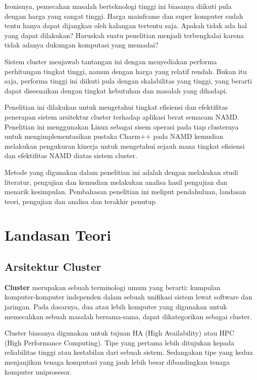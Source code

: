 \documentclass[aps,showpacs,pre,floatfix]{revtex4}
\begin{document}
Ironisnya, pemecahan masalah berteknologi tinggi ini biasanya
diikuti pula dengan harga yang sangat tinggi. Harga mainframe dan
super komputer sudah tentu hanya dapat dijangkau oleh kalangan
tertentu saja. Apakah tidak ada hal yang dapat dilakukan? Haruskah
suatu penelitian menjadi terbengkalai karena tidak adanya dukungan
komputasi yang memadai?

Sistem cluster menjawab tantangan ini dengan menyediakan performa
perhitungan tingkat tinggi, namun dengan harga yang relatif
rendah. Bukan itu saja, performa tinggi ini diikuti pula dengan
skalabilitas yang tinggi, yang berarti dapat disesuaikan dengan
tingkat kebutuhan dan masalah yang dihadapi.

Penelitian ini dilakukan untuk mengetahui tingkat efisiensi dan
efektifitas penerapan sistem arsitektur cluster terhadap aplikasi
berat semacam NAMD. Penelitian ini menggunakan Linux sebagai sisem
operasi pada tiap clusternya untuk mengimplementasikan pustaka
Charm++ pada NAMD kemudian melakukan pengukuran kinerja untuk
mengetahui sejauh mana tingkat efisiensi dan efektifitas NAMD
diatas sistem cluster.

Metode yang digunakan dalam penelitian ini adalah dengan melakukan
studi literatur, pengujian dan kemudian melakukan analisa hasil
pengujian dan menarik kesimpulan. Pembahasan penelitian ini
meliput pendahuluan, landasan teori, pengujian dan analisa dan
terakhir penutup


\section{Landasan Teori}



\subsection{Arsitektur Cluster}

\textbf{Cluster} merupakan sebuah terminologi umum yang berarti:
kumpulan komputer-komputer independen dalam sebuah unifikasi
sistem lewat software dan jaringan. Pada dasarnya, dua atau lebih
komputer yang digunakan untuk memecahkan sebuah masalah
bersama-sama, dapat dikategorikan sebagai cluster.

Cluster biasanya digunakan untuk tujuan HA (High Availability)
atau HPC (High Performance Computing). Tipe yang pertama lebih
ditujukan kepada reliabilitas tinggi atau kestabilan dari sebuah
sistem. Sedangakan tipe yang kedua menjanjikan tenaga komputasi
yang jauh lebih besar dibandingkan tenaga komputer uniprosesor.
\end{document}
